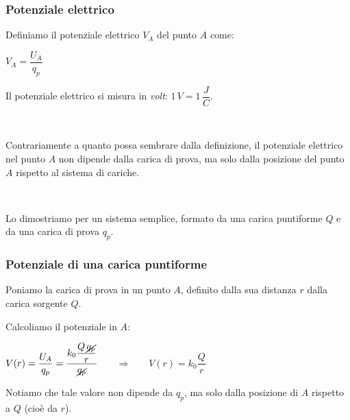 \documentclass[handout]{beamer}
\theoremstyle{plain}
\begin{document}
\begin{frame}
\frametitle{Potenziale elettrico}
Definiamo il potenziale elettrico $ V_A $ del punto $ A $ come:
\begin{center}
\colorbox{blue!30}{$ V_A = \dfrac{U_A}{q_p} $}
\end{center}
Il potenziale elettrico si misura in \emph{volt}: $ 1 \, V = 1 \, \dfrac{J}{C} $.\pause

~

Contrariamente a quanto possa sembrare dalla definizione, \alert<2>{il potenziale elettrico nel punto $ A $ non dipende dalla carica di prova}, ma solo dalla posizione del punto $ A $ rispetto al sistema di cariche.
\pause

~

Lo dimostriamo per un sistema semplice, formato da \alert<3>{una carica puntiforme $ Q $ e da una carica di prova $ q_p $}.
\end{frame}


\begin{frame}
\frametitle{Potenziale di una carica puntiforme}
Poniamo la carica di prova in un punto $ A $, definito dalla sua distanza $ r $ dalla carica sorgente $ Q $.
\begin{figure}
\end{figure}\pause
Calcoliamo il potenziale in $ A $:
\begin{center}
$ V(r) = \dfrac{U_A}{q_p} = \dfrac{k_0 \dfrac{Q \, \cancel{q_p} }{r}}{\cancel{q_p}} $ ~~~\pause$ \Longrightarrow  $~~~ \colorbox{blue!30}{$ V(r) = k_0 \dfrac{Q}{r} $} 
\end{center}
Notiamo che \alert<3>{tale valore non dipende da $ q_p $, ma solo dalla posizione di $ A $ rispetto a $ Q $ (cioè da $ r $)}.
\end{frame}
\end{document}
